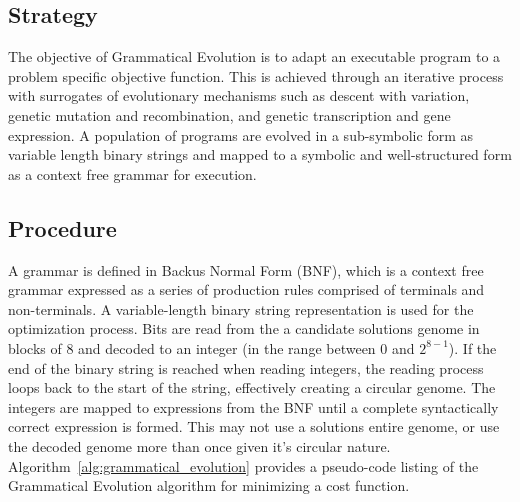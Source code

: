\subsection{Strategy}
The objective of Grammatical Evolution is to adapt an executable program to a problem specific objective function.
This is achieved through an iterative process with surrogates of evolutionary mechanisms such as descent with variation, genetic mutation and recombination, and genetic transcription and gene expression. A population of programs are evolved in a sub-symbolic form as variable length binary strings and mapped to a symbolic and well-structured form as a context free grammar for execution.

\subsection{Procedure}
A grammar is defined in Backus Normal Form (BNF), which is a context free grammar expressed as a series of production rules comprised of terminals and non-terminals.
A variable-length binary string representation is used for the optimization process. Bits are read from the a candidate solutions genome in blocks of 8 and decoded to an integer (in the range between 0 and $2^{8-1}$). If the end of the binary string is reached when reading integers, the reading process loops back to the start of the string, effectively creating a circular genome. The integers are mapped to expressions from the BNF until a complete syntactically correct expression is formed. This may not use a solutions entire genome, or use the decoded genome more than once given it's circular nature.
Algorithm~\ref{alg:grammatical_evolution} provides a pseudo-code listing of the Grammatical Evolution algorithm for minimizing a cost function.


